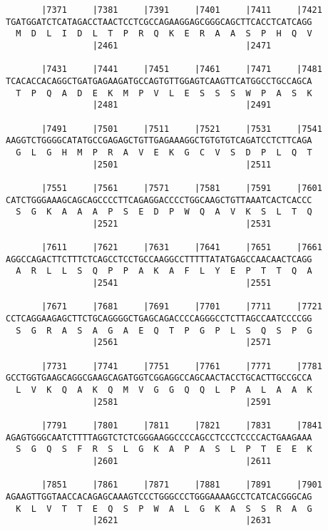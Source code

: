 \documentclass{article}
\begin{document}
\begin{Verbatim}
       |7371     |7381     |7391     |7401     |7411     |7421
TGATGGATCTCATAGACCTAACTCCTCGCCAGAAGGAGCGGGCAGCTTCACCTCATCAGG
  M  D  L  I  D  L  T  P  R  Q  K  E  R  A  A  S  P  H  Q  V
                 |2461                         |2471        
  
       |7431     |7441     |7451     |7461     |7471     |7481
TCACACCACAGGCTGATGAGAAGATGCCAGTGTTGGAGTCAAGTTCATGGCCTGCCAGCA
  T  P  Q  A  D  E  K  M  P  V  L  E  S  S  S  W  P  A  S  K
                 |2481                         |2491        
  
       |7491     |7501     |7511     |7521     |7531     |7541
AAGGTCTGGGGCATATGCCGAGAGCTGTTGAGAAAGGCTGTGTGTCAGATCCTCTTCAGA
  G  L  G  H  M  P  R  A  V  E  K  G  C  V  S  D  P  L  Q  T
                 |2501                         |2511        
  
       |7551     |7561     |7571     |7581     |7591     |7601
CATCTGGGAAAGCAGCAGCCCCTTCAGAGGACCCCTGGCAAGCTGTTAAATCACTCACCC
  S  G  K  A  A  A  P  S  E  D  P  W  Q  A  V  K  S  L  T  Q
                 |2521                         |2531        
  
       |7611     |7621     |7631     |7641     |7651     |7661
AGGCCAGACTTCTTTCTCAGCCTCCTGCCAAGGCCTTTTTATATGAGCCAACAACTCAGG
  A  R  L  L  S  Q  P  P  A  K  A  F  L  Y  E  P  T  T  Q  A
                 |2541                         |2551        
  
       |7671     |7681     |7691     |7701     |7711     |7721
CCTCAGGAAGAGCTTCTGCAGGGGCTGAGCAGACCCCAGGGCCTCTTAGCCAATCCCCGG
  S  G  R  A  S  A  G  A  E  Q  T  P  G  P  L  S  Q  S  P  G
                 |2561                         |2571        
  
       |7731     |7741     |7751     |7761     |7771     |7781
GCCTGGTGAAGCAGGCGAAGCAGATGGTCGGAGGCCAGCAACTACCTGCACTTGCCGCCA
  L  V  K  Q  A  K  Q  M  V  G  G  Q  Q  L  P  A  L  A  A  K
                 |2581                         |2591        
  
       |7791     |7801     |7811     |7821     |7831     |7841
AGAGTGGGCAATCTTTTAGGTCTCTCGGGAAGGCCCCAGCCTCCCTCCCCACTGAAGAAA
  S  G  Q  S  F  R  S  L  G  K  A  P  A  S  L  P  T  E  E  K
                 |2601                         |2611        
  
       |7851     |7861     |7871     |7881     |7891     |7901
AGAAGTTGGTAACCACAGAGCAAAGTCCCTGGGCCCTGGGAAAAGCCTCATCACGGGCAG
  K  L  V  T  T  E  Q  S  P  W  A  L  G  K  A  S  S  R  A  G
                 |2621                         |2631        
  

\end{Verbatim}
\end{document}
